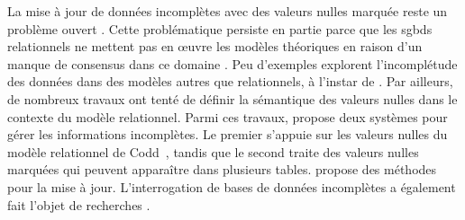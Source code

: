 La mise à jour de données incomplètes avec des valeurs nulles marquée reste un problème ouvert \cite{libkinIncompleteDataWhat2014,consoleCopingIncompleteData2020}.
Cette problématique persiste en partie parce que les \glspl{sgbd} relationnels ne mettent pas en œuvre les modèles théoriques en raison d'un manque de consensus dans ce domaine \cite{zanioloDatabaseRelationsNull1984,faginSemanticsUpdatesDatabases1983,imielinskiIncompleteInformationRelational1984,abiteboulUpdateSemanticsIncomplete1985,reiterSoundSometimesComplete1986,faginUpdatingLogicalDatabases1986,winslettModelbasedApproachUpdating1988,winslettUpdatingLogicalDatabases1990,grahneProblemIncompleteInformation1991}.
Peu d'exemples explorent l'incomplétude des données dans des modèles autres que relationnels, à l'instar de \cite{sirangeloRepresentingQueryingIncomplete2014}.
Par ailleurs, de nombreux travaux ont tenté de définir la sémantique des valeurs nulles dans le contexte du modèle relationnel.
Parmi ces travaux, \cite{imielinskiIncompleteInformationRelational1984} propose deux systèmes pour gérer les informations incomplètes.
Le premier s'appuie sur les valeurs nulles du modèle relationnel de Codd~\cite{coddRelationalModelData1970}, tandis que le second traite des valeurs nulles marquées qui peuvent apparaître dans plusieurs tables.
\cite{degiacomoDealingInconsistenciesIncompleteness2009,degiacomoPracticalUpdateManagement2017,chabinConsistentUpdatingDatabases2020} propose des méthodes pour la mise à jour.
L'interrogation de bases de données incomplètes a également fait l'objet de recherches \cite{zanioloDatabaseRelationsNull1984,faginUpdatingLogicalDatabases1986,grahneProblemIncompleteInformation1991,bravoSemanticallyCorrectQuery2006,libkinSQLThreevaluedLogic2016,nikolaouQueryingIncompleteInformation2016,guagliardoCorrectnessSQLQueries2017}.
